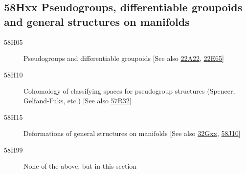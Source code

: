 \subsection*{58Hxx  Pseudogroups, differentiable groupoids and general structures on manifolds }\label{58Hxx}
\begin{description}  
\item [58H05]\label{58H05} Pseudogroups and differentiable groupoids [See also \hyperref[22A22]{22A22}, \hyperref[22E65]{22E65}]
\item [58H10]\label{58H10} Cohomology of classifying spaces for pseudogroup structures (Spencer, Gelfand-Fuks, etc.) [See also \hyperref[57R32]{57R32}]
\item [58H15]\label{58H15} Deformations of general structures on manifolds [See also \hyperref[32Gxx]{32Gxx}, \hyperref[58J10]{58J10}]
\item [58H99]\label{58H99} None of the above, but in this section
\end{description}

